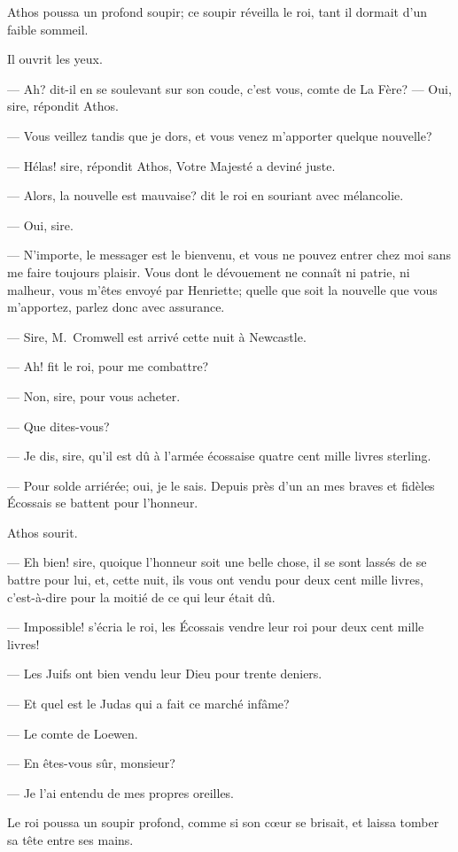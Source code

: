 Athos poussa un profond soupir; ce soupir réveilla le roi, tant il dormait d'un faible sommeil.

Il ouvrit les yeux.

— Ah? dit-il en se soulevant sur son coude, c'est vous, comte de La Fère?
— Oui, sire, répondit Athos.

— Vous veillez tandis que je dors, et vous venez m'apporter quelque nouvelle?

— Hélas! sire, répondit Athos, Votre Majesté a deviné juste.

— Alors, la nouvelle est mauvaise? dit le roi en souriant avec mélancolie.

— Oui, sire.

— N'importe, le messager est le bienvenu, et vous ne pouvez entrer chez moi sans me faire toujours plaisir. Vous dont le dévouement ne connaît ni patrie, ni malheur, vous m'êtes envoyé par Henriette; quelle que soit la nouvelle que vous m'apportez, parlez donc avec assurance.

— Sire, M.~Cromwell est arrivé cette nuit à Newcastle.

— Ah! fit le roi, pour me combattre?

— Non, sire, pour vous acheter.

— Que dites-vous?

— Je dis, sire, qu'il est dû à l'armée écossaise quatre cent mille livres sterling.

— Pour solde arriérée; oui, je le sais. Depuis près d'un an mes braves et fidèles Écossais se battent pour l'honneur.

Athos sourit.

— Eh bien! sire, quoique l'honneur soit une belle chose, il se sont lassés de se battre pour lui, et, cette nuit, ils vous ont vendu pour deux cent mille livres, c'est-à-dire pour la moitié de ce qui leur était dû.

— Impossible! s'écria le roi, les Écossais vendre leur roi pour deux cent mille livres!

— Les Juifs ont bien vendu leur Dieu pour trente deniers.

— Et quel est le Judas qui a fait ce marché infâme?

— Le comte de Loewen.

— En êtes-vous sûr, monsieur?

— Je l'ai entendu de mes propres oreilles.

Le roi poussa un soupir profond, comme si son cœur se brisait, et laissa tomber sa tête entre ses mains.

